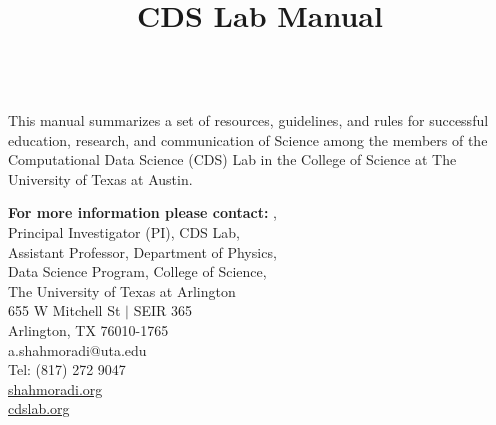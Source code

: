 \documentclass[11pt,letterpaper]{report}
\begin{document}
\univlogo
\title{CDS Lab Manual}

\\[5mm]


This manual summarizes a set of resources, guidelines, and rules for successful education, research, and communication of Science among the members of the Computational Data Science (CDS) Lab in the College of Science at The University of Texas at Austin. \newpar

{\large\bf For more information please contact:} \newpar\newpar
\onehalfspace
\-\hspace{1in}\href{a.shahmoradi@uta.edu}{\amirs}, \\
\-\hspace{1in}Principal Investigator (PI), CDS Lab, \\
\-\hspace{1in}Assistant Professor, Department of Physics, \\
\-\hspace{1in}Data Science Program, College of Science, \\ 
\-\hspace{1in}The University of Texas at Arlington \\
\-\hspace{1in}655 W Mitchell St $\vert$ SEIR 365 \\
\-\hspace{1in}Arlington, TX 76010-1765 \\
\-\hspace{1in}a.shahmoradi@uta.edu \\
\-\hspace{1in}Tel: (817) 272 9047 \\
\-\hspace{1in}\url{shahmoradi.org} \\
\-\hspace{1in}\url{cdslab.org}
\singlespace

\tableofcontents


%
%



%
\end{document}
